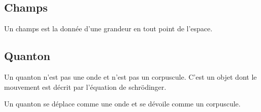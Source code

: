 

%
\subsection{Champs}

Un champs est la donnée d'une grandeur en tout point de l'espace.

\subsection{Quanton}
%
Un quanton n'est pas une onde et n'est pas un corpuscule. C'est un objet dont le mouvement est décrit par l'équation de schrödinger.

Un quanton se déplace comme une onde et se dévoile comme un corpuscule.

